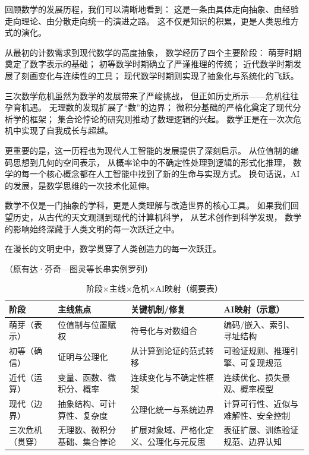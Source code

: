 回顾数学的发展历程，我们可以清晰地看到：  
这是一条由具体走向抽象、由经验走向理论、由分散走向统一的演进之路。  
这不仅是知识的积累，更是人类思维方式的演化。

从最初的计数需求到现代数学的高度抽象，  
数学经历了四个主要阶段：  
萌芽时期奠定了数字表示的基础；  
初等数学时期确立了严谨推理的传统；  
近代数学时期发展了刻画变化与连续性的工具；  
现代数学时期则实现了抽象化与系统化的飞跃。

三次数学危机虽然为数学的发展带来了严峻挑战，  
但正如历史所示——危机往往孕育机遇。  
无理数的发现扩展了“数”的边界；  
微积分基础的严格化奠定了现代分析学的框架；  
集合论悖论的研究则推动了数理逻辑的兴起。  
数学正是在一次次危机中实现了自我成长与超越。

更重要的是，这一历程也为现代人工智能的发展提供了深刻启示。  
从位值制的编码思想到几何的空间表示，  
从概率论中的不确定性处理到逻辑的形式化推理，  
数学的每一个核心概念都在人工智能中找到了新的生命与实现方式。  
换句话说，AI的发展，是数学思维的一次技术化延伸。

数学不仅是一门抽象的学科，更是人类理解与改造世界的核心工具。  
如果我们回望历史，从古代的天文观测到现代的计算机科学，  
从艺术创作到科学发现，  
数学的影响始终深藏于人类文明的每一次跃迁之中。

在漫长的文明史中，数学贯穿了人类创造力的每一次跃迁。  

（原有达·芬奇—图灵等长串实例罗列）
\begin{table}[htbp]
\centering
\caption{阶段×主线×危机×AI映射（纲要表）}
\begin{tabular}{|p{2.6cm}|p{3.2cm}|p{4.4cm}|p{4.8cm}|}
\hline
\textbf{阶段} & \textbf{主线焦点} & \textbf{关键机制/修复} & \textbf{AI映射（示意）} \\
\hline
萌芽（表示） & 位值制与位置赋权 & 符号化与对数组合 & 编码/嵌入、索引、寻址结构 \\
\hline
初等（确信） & 证明与公理化 & 从计算到论证的范式转移 & 可验证规则、推理引擎、可复现规范 \\
\hline
近代（运算） & 变量、函数、微积分、概率 & 连续变化与不确定性框架 & 连续优化、损失景观、概率模型 \\
\hline
现代（边界） & 抽象结构、可计算性、复杂度 & 公理化统一与系统边界 & 计算可行性、近似与难解性、安全控制 \\
\hline
三次危机（贯穿） & 无理数、微积分基础、集合悖论 & 扩展对象域、严格化定义、公理化与元反思 & 表征扩展、训练验证规范、边界认知 \\
\hline
\end{tabular}
\end{table}


